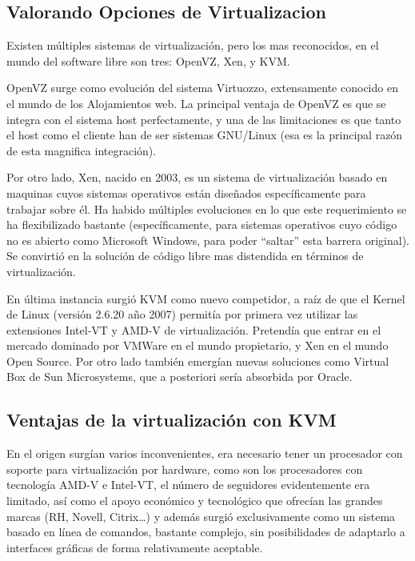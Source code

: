 \subsection{Valorando Opciones de Virtualizacion}

Existen múltiples sistemas de virtualización, pero los mas reconocidos, en el mundo del software libre son tres: OpenVZ, Xen, y KVM. 

OpenVZ surge como evolución del sistema Virtuozzo, extensamente conocido en el mundo de los Alojamientos web. La principal ventaja de OpenVZ es que se integra con el sistema host perfectamente, y una de las limitaciones es que tanto el host como el cliente han de ser sistemas GNU/Linux (esa es la principal razón de esta magnifica integración). 

Por otro lado, Xen, nacido en 2003, es un sistema de virtualización basado en maquinas cuyos sistemas operativos están diseñados específicamente para trabajar sobre él. Ha habido múltiples evoluciones en lo que este requerimiento se ha flexibilizado bastante (específicamente, para sistemas operativos cuyo código no es abierto como Microsoft Windows, para poder “saltar” esta barrera original). Se convirtió en la solución de código libre mas distendida en términos de virtualización.

En última instancia surgió KVM como nuevo competidor, a raíz de que el Kernel de Linux (versión 2.6.20 año 2007) permitía por primera vez utilizar las extensiones Intel-VT y AMD-V de virtualización. Pretendía que entrar en el mercado dominado por VMWare en el mundo propietario, y Xen en el mundo Open Source. Por otro lado también emergían nuevas soluciones como Virtual Box de Sun Microsystems, que a posteriori sería absorbida por Oracle.

\subsection{Ventajas de la virtualización con KVM}

En el origen surgían varios inconvenientes, era necesario tener un procesador con soporte para virtualización por hardware, como son los procesadores con tecnología AMD-V e Intel-VT, el número de seguidores evidentemente era limitado, así como el apoyo económico y tecnológico que ofrecían las grandes marcas (RH, Novell, Citrix…) y además surgió exclusivamente como un sistema basado en línea de comandos, bastante complejo, sin posibilidades de adaptarlo a interfaces gráficas de forma relativamente aceptable.

